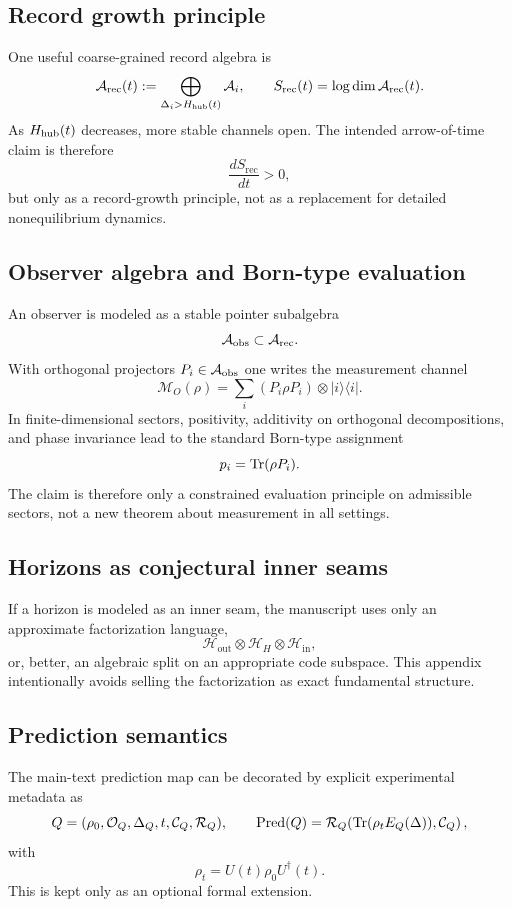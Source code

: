 \subsection{Record growth principle}

One useful coarse-grained record algebra is
\[
\mathcal A_{\mathrm{rec}}(t):=\bigoplus_{\Delta_i>H_{\mathrm{hub}}(t)}\mathcal A_i,
\qquad
S_{\mathrm{rec}}(t)=\log\dim\mathcal A_{\mathrm{rec}}(t).
\]
As $H_{\mathrm{hub}}(t)$ decreases, more stable channels open. The intended arrow-of-time claim is therefore
\[
\frac{dS_{\mathrm{rec}}}{dt}>0,
\]
but only as a record-growth principle, not as a replacement for detailed nonequilibrium dynamics.

\subsection{Observer algebra and Born-type evaluation}

An observer is modeled as a stable pointer subalgebra
\[
\mathcal A_{\mathrm{obs}}\subset\mathcal A_{\mathrm{rec}}.
\]
With orthogonal projectors $P_i\in\mathcal A_{\mathrm{obs}}$ one writes the measurement channel
\[
\mathcal M_O(\rho)=\sum_i(P_i\rho P_i)\otimes |i\rangle\langle i|.
\]
In finite-dimensional sectors, positivity, additivity on orthogonal decompositions, and phase invariance lead to the standard Born-type assignment
\[
p_i=\operatorname{Tr}(\rho P_i).
\]
The claim is therefore only a constrained evaluation principle on admissible sectors, not a new theorem about measurement in all settings.

\subsection{Horizons as conjectural inner seams}

If a horizon is modeled as an inner seam, the manuscript uses only an approximate factorization language,
\[
\mathcal H_{\mathrm{out}}\otimes\mathcal H_H\otimes\mathcal H_{\mathrm{in}},
\]
or, better, an algebraic split on an appropriate code subspace. This appendix intentionally avoids selling the factorization as exact fundamental structure.

\subsection{Prediction semantics}

The main-text prediction map can be decorated by explicit experimental metadata as
\[
Q=(\rho_0,\mathcal O_Q,\Delta_Q,t,\mathcal C_Q,\mathcal R_Q),
\qquad
\operatorname{Pred}(Q)=\mathcal R_Q\!\left(\operatorname{Tr}(\rho_tE_Q(\Delta)),\mathcal C_Q\right),
\]
with
\[
\rho_t=U(t)\rho_0U^\dagger(t).
\]
This is kept only as an optional formal extension.

